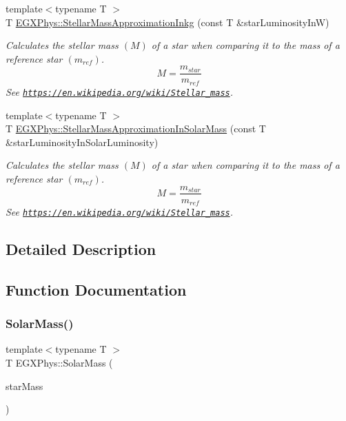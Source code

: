 \begin{DoxyCompactItemize}
{\footnotesize template$<$typename T $>$ }\\T \mbox{\hyperlink{group___e_g_x_phys-_stellar_mass_ga21d4a1964c4fada8367804113d9f3123}{E\+G\+X\+Phys\+::\+Stellar\+Mass\+Approximation\+Inkg}} (const T \&star\+Luminosity\+InW)
\begin{DoxyCompactList}\small\item\em Calculates the stellar mass $(M)$ of a star when comparing it to the mass of a reference star $(m_{ref})$. \[M=\frac{m_{star}}{m_{ref}}\] See \href{https://en.wikipedia.org/wiki/Stellar_mass}{\tt https\+://en.\+wikipedia.\+org/wiki/\+Stellar\+\_\+mass}. \end{DoxyCompactList}\item 
{\footnotesize template$<$typename T $>$ }\\T \mbox{\hyperlink{group___e_g_x_phys-_stellar_mass_gaa00fb881be48df4eba9838ada6bffa33}{E\+G\+X\+Phys\+::\+Stellar\+Mass\+Approximation\+In\+Solar\+Mass}} (const T \&star\+Luminosity\+In\+Solar\+Luminosity)
\begin{DoxyCompactList}\small\item\em Calculates the stellar mass $(M)$ of a star when comparing it to the mass of a reference star $(m_{ref})$. \[M=\frac{m_{star}}{m_{ref}}\] See \href{https://en.wikipedia.org/wiki/Stellar_mass}{\tt https\+://en.\+wikipedia.\+org/wiki/\+Stellar\+\_\+mass}. \end{DoxyCompactList}\end{DoxyCompactItemize}


\subsection{Detailed Description}


\subsection{Function Documentation}
\mbox{\label{group___e_g_x_phys-_stellar_mass_gac393d64d586be3dc76ac7a98ac336514}} 
\subsubsection{\texorpdfstring{Solar\+Mass()}{SolarMass()}}
{\footnotesize\ttfamily template$<$typename T $>$ \\
T E\+G\+X\+Phys\+::\+Solar\+Mass (\begin{DoxyParamCaption}\item[{const T \&}]{star\+Mass }\end{DoxyParamCaption})}



